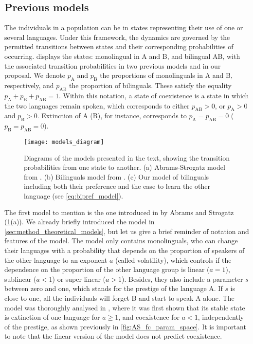 \documentclass[../thesis.tex]{subfiles}
\begin{document}
\subsection{Previous models}
The individuals in a population can be in states representing their use of one or
several languages. Under this framework, the dynamics are governed by the permitted
transitions between states and their corresponding probabilities of occurring.
 displays the states: monolingual in A and B, and bilingual AB,
with the associated transition probabilities in two previous models and in our proposal.
We denote $p_{\text{A}}$ and $p_{\text{B}}$ the proportions of monolinguals in A and B,
respectively, and $p_{\text{AB}}$ the proportion of bilinguals. These satisfy the
equality $p_{\text{A}} + p_{\text{B}} + p_{\text{AB}} = 1$. Within this notation, a
state of coexistence is a state in which the two languages remain spoken, which
corresponds to either $p_{\text{AB}} > 0$, or $p_{\text{A}} > 0$ and $p_{\text{B}} > 0$.
Extinction of A (B), for instance, corresponds to $p_{\text{A}} = p_{\text{AB}} = 0$
($p_{\text{B}} = p_{\text{AB}} = 0$).
\begin{figure}
\centering
    \texttt{[image: models\_diagram]}
    \caption{Diagrams of the models presented in the text, showing the transition
    probabilities from one state to another. (a) Abrams-Strogatz model from
    \cite{AbramsModellingDynamics2003}. (b) Bilinguals model from
    \cite{CastelloOrderingDynamics2006}. (c) Our model of bilinguals including both
    their preference and the ease to learn the other language (see
    \cref{eq:bipref_model}).}
    \label{fig:models_diagram}
\end{figure}

The first model to mention is the one introduced in \cite{AbramsModellingDynamics2003}
by Abrams and Strogatz (\cref{fig:models_diagram}(a)). We already briefly introduced the
model in \cref{sec:method_theoretical_models}, but let us give a brief reminder of
notation and features of the model. The model only contains monolinguals, who can change
their languages with a probability that depends on the proportion of speakers of the
other language to an exponent $a$ (called volatility), which controls if the dependence
on the proportion of the other language group is linear ($a = 1$), sublinear ($a<1$) or
super-linear ($a>1$). Besides, they also include a parameter $s$ between zero and one,
which stands for the prestige of the language A. If $s$ is close to one, all the
individuals will forget B and start to speak A alone.
The model was thoroughly analysed in \cite{VazquezAgentBased2010}, where it was first
shown that its stable state is extinction of one language for $a \ge 1$, and coexistence
for $a < 1$, independently of the prestige, as shown previously in
\cref{fig:AS_fc_param_space}.
It is important to note that the linear version of the model does not predict
coexistence.    
\end{document}
